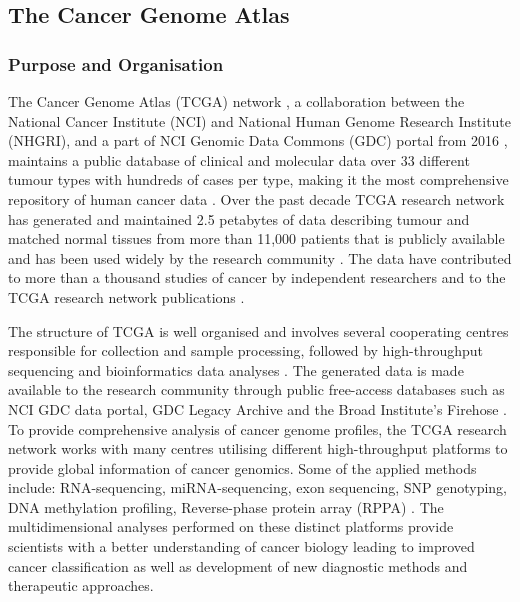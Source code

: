     \newpage    
    \subsection{The Cancer Genome Atlas}
    
    
    
    \subsubsection{Purpose and Organisation}

    The Cancer Genome Atlas (TCGA) network \cite{TheTCGA}, a collaboration between the National Cancer Institute (NCI) and National Human Genome Research Institute (NHGRI), and a part of NCI Genomic Data Commons (GDC) portal from 2016 \cite{NCICommons, gdc2016}, maintains a public database of clinical and molecular data over 33 different tumour types with hundreds of cases per type, making it the most comprehensive repository of human cancer data \cite{OverviewTCGA}. Over the past decade TCGA research network has generated and maintained 2.5 petabytes of data describing tumour and matched normal tissues from more than 11,000 patients that is publicly available and has been used widely by the research community \cite{OverviewTCGA}. The data have contributed to more than a thousand studies of cancer by independent researchers and to the TCGA research network publications \cite{Editorial.2015TheGenomics}.

    The structure of TCGA is well organised and involves several cooperating centres responsible for collection and sample processing, followed by high-throughput sequencing and bioinformatics data analyses \cite{OverviewTCGA, Tomczak2015TheKnowledge}. The generated data is made available to the research community through public free-access databases such as NCI GDC data portal, GDC Legacy Archive and the Broad Institute’s Firehose \cite{PapaleoTCGAPackages}. \\To provide comprehensive analysis of cancer genome profiles, the TCGA research network works with many centres utilising different high-throughput platforms to provide global information of cancer genomics. Some of the applied methods include: RNA-sequencing, miRNA-sequencing, exon sequencing, SNP genotyping, DNA methylation profiling, Reverse-phase protein array (RPPA) \cite{OverviewTCGA}. The multidimensional analyses performed on these distinct platforms provide scientists with a better understanding of cancer biology leading to improved cancer classification as well as development of new diagnostic methods and therapeutic approaches.\\



